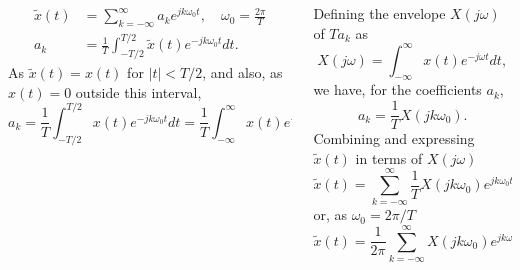 \begin{frame}


    \begin{columns}[T]
        \begin{column}{0.5\textwidth}
            
            \begin{align*}
                \tilde{x}(t) &= \sum_{k=-\infty}^{\infty}a_ke^{jk\omega_0 t},\quad \omega_0 =\frac{2\pi}{T}\\
                a_k &= \frac{1}{T}\int_{-T/2}^{T/2}\tilde{x}(t)e^{-jk\omega_0 t}dt.
            \end{align*}
            As $\tilde{x}(t) = x(t)$ for $|t| < T/2$, and also, as $x(t) = 0$ outside this interval,
            \begin{equation*}
                a_k = \frac{1}{T}\int_{-T/2}^{T/2}x(t)e^{-jk\omega_0 t}dt = \frac{1}{T}\int_{-\infty}^{\infty}x(t)e^{-jk\omega_0 t}dt.
            \end{equation*}
        \end{column}
        \begin{column}{0.5\textwidth}
            Defining the envelope $X(j\omega)$ of $Ta_k$ as
            \begin{equation*}
                X(j\omega) = \int_{-\infty}^{\infty}x(t)e^{-j\omega t}dt,
            \end{equation*}
            we have, for the coefficients $a_k$,
            \begin{equation*}
                a_k = \frac{1}{T}X(jk\omega_0).
            \end{equation*}
            Combining and expressing $\tilde{x}(t)$ in terms of $X(j\omega)$
            \begin{equation*}
                \tilde{x}(t) = \sum_{k=-\infty}^{\infty} \frac{1}{T}X(jk\omega_0)e^{jk\omega_0 t},
            \end{equation*}
            or, as $\omega_0 =2\pi/T$
            \begin{equation}
                \label{eq:xtildet_with_ft}
                \tilde{x}(t) = \frac{1}{2\pi}\sum_{k=-\infty}^{\infty} X(jk\omega_0)e^{jk\omega_0 t}\omega_0.
            \end{equation}
        \end{column}
    \end{columns}
\end{frame}


